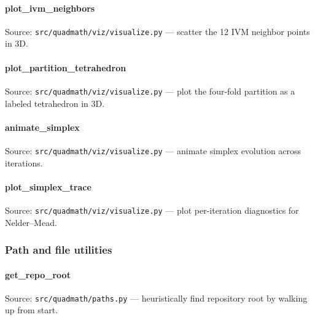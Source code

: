 \documentclass[
  10pt,
]{article}
\newcommand{\passthrough}[1]{#1}
\renewcommand{\texttt}[1]{%
    \colorbox{codebg}{\color{codefg}\ttfamily #1}%
}
\begin{document}
\paragraph{\texorpdfstring{\texttt{plot\_ivm\_neighbors}}{plot\_ivm\_neighbors}}\label{code:plot_ivm_neighbors}

Source: \passthrough{\lstinline!src/quadmath/viz/visualize.py!} ---
scatter the 12 IVM neighbor points in 3D.

\paragraph{\texorpdfstring{\texttt{plot\_partition\_tetrahedron}}{plot\_partition\_tetrahedron}}\label{code:plot_partition_tetrahedron}

Source: \passthrough{\lstinline!src/quadmath/viz/visualize.py!} --- plot
the four-fold partition as a labeled tetrahedron in 3D.

\paragraph{\texorpdfstring{\texttt{animate\_simplex}}{animate\_simplex}}\label{code:animate_simplex}

Source: \passthrough{\lstinline!src/quadmath/viz/visualize.py!} ---
animate simplex evolution across iterations.

\paragraph{\texorpdfstring{\texttt{plot\_simplex\_trace}}{plot\_simplex\_trace}}\label{code:plot_simplex_trace}

Source: \passthrough{\lstinline!src/quadmath/viz/visualize.py!} --- plot
per-iteration diagnostics for Nelder--Mead.

\subsubsection{Path and file utilities}\label{code:utilities}

\paragraph{\texorpdfstring{\texttt{get\_repo\_root}}{get\_repo\_root}}\label{code:get_repo_root}

Source: \passthrough{\lstinline!src/quadmath/paths.py!} ---
heuristically find repository root by walking up from start.
\end{document}
